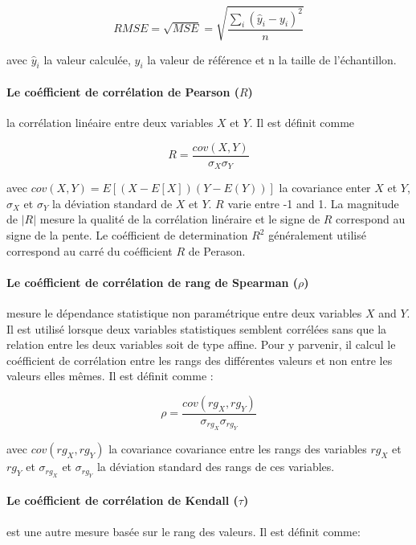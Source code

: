 \begin{equation}
    RMSE = \sqrt{MSE} = \sqrt{\frac{\sum_i{(\hat{y}_i-y_i)^2}}{n}}
\end{equation}

avec $\hat{y}_i$ la valeur calculée, $y_i$ la valeur de référence et n la taille de l'échantillon.

\paragraph{Le coéfficient de corrélation de Pearson ($R$)} la corrélation linéaire entre deux variables $X$ et $Y$. Il est définit comme

\begin{equation}
    R = \frac{cov(X,Y)}{\sigma_X \sigma_Y}
\end{equation}

avec $cov(X,Y)=E[(X-E[X])(Y-E(Y))]$ la covariance enter $X$ et $Y$, $\sigma_X$ et $\sigma_Y$ la déviation standard de $X$ et $Y$. $R$ varie entre -1 and 1. La magnitude de $|R|$ mesure la qualité de la corrélation linéraire et le signe de $R$ correspond au signe de la pente. Le coéfficient de determination $R^2$ généralement utilisé correspond au carré du coéfficient $R$ de Perason.

\paragraph{ Le coéfficient de corrélation de rang de Spearman ($\rho$)}  mesure le dépendance statistique non paramétrique entre deux variables $X$ and $Y$. Il est utilisé lorsque deux variables statistiques semblent corrélées sans que la relation entre les deux variables soit de type affine. Pour y parvenir, il calcul le coéfficient de corrélation entre les rangs des différentes valeurs et non entre les valeurs elles mêmes. Il est définit comme :

\begin{equation}
    \rho = \frac{cov(rg_X,rg_Y)}{\sigma_{rg_X} \sigma_{rg_Y}}
\end{equation}

avec $cov(rg_X,rg_Y)$ la covariance covariance entre les rangs des variables $rg_X$ et $rg_Y$ et $\sigma_{rg_X}$ et $\sigma_{rg_Y}$ la déviation standard des rangs de ces variables. 

\paragraph{Le coéfficient de corrélation de Kendall ($\tau$)}  est une autre mesure basée sur le rang des valeurs. Il est définit comme:

